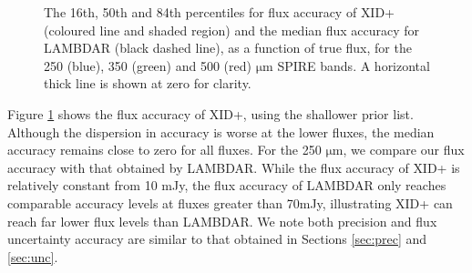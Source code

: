 \documentclass[useAMS,usenatbib]{mnras}
\begin{document}
\begin{figure}
\centering 
{}
\caption{The 16th, 50th and 84th percentiles for flux accuracy of \textsc{XID+} (coloured line and shaded region) and the median flux accuracy for \textsc{LAMBDAR} (black dashed line), as a function of true flux, for the 250 (blue), 350 (green) and 500 (red) $\mathrm{\mu m}$ SPIRE bands. A horizontal thick line is shown at zero for clarity.}\label{fig:accuracy_2}
\end{figure}

Figure \ref{fig:accuracy_2} shows the flux accuracy of \textsc{XID+}, using the shallower prior list. Although the dispersion in accuracy is worse at the lower fluxes, the median accuracy remains close to zero for all fluxes. For the 250 $\mathrm{\mu m}$, we compare our flux accuracy with that obtained by \textsc{LAMBDAR}. While the flux accuracy of \textsc{XID+} is relatively constant from 10 mJy, the flux accuracy of \textsc{LAMBDAR} only reaches comparable accuracy levels at fluxes greater than 70mJy, illustrating \textsc{XID+} can reach far lower flux levels than \textsc{LAMBDAR}. We note both precision and flux uncertainty accuracy are similar to that obtained in Sections \ref{sec:prec} and \ref{sec:unc}.
\end{document}
